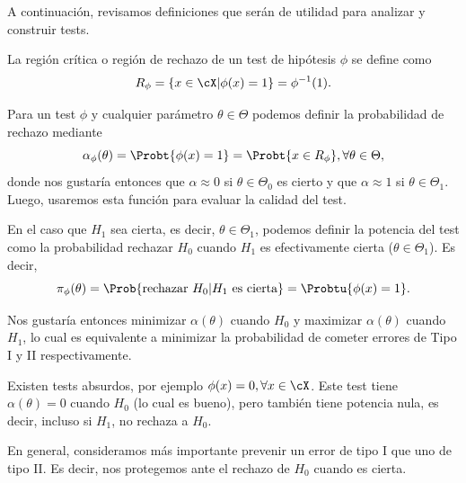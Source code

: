 A continuación, revisamos definiciones que serán de utilidad para analizar y construir tests. 

\begin{definition}
	La región crítica o región de rechazo de un test de hipótesis $\phi$ se define como 
	\begin{equation}
		R_\phi = \{x\in\cX | \phi(x)=1\} = \phi^{-1}(1).
	\end{equation}
	
\end{definition}



\begin{definition}
Para un test $\phi$ y cualquier parámetro $\theta\in\Theta$ podemos definir la probabilidad de rechazo mediante
\begin{equation}
 	\alpha_\phi(\theta) = \Probt{\phi(x)=1} = \Probt{x\in R_\phi}, \forall\theta\in\Theta,
 \end{equation}
donde nos gustaría entonces que $\alpha\approx 0$ si $\theta\in\Theta_0$ es cierto y que $\alpha\approx 1$ si $\theta\in\Theta_1$. Luego, usaremos esta función para evaluar la calidad del test.
\end{definition}

\begin{definition}
En el caso que $H_1$ sea cierta, es decir, $\theta\in\Theta_1$, podemos definir la potencia del test como la probabilidad rechazar $H_0$ cuando $H_1$ es efectivamente cierta ($\theta\in\Theta_1$). Es decir,
\begin{equation}
 	\pi_\phi(\theta) = \Prob{\text{rechazar } H_0 | H_1 \text{ es cierta}}  = \Probtu{\phi(x)=1}.
 \end{equation}
 \end{definition}
Nos gustaría entonces minimizar $\alpha(\theta)$ cuando $H_0$ y maximizar $\alpha(\theta)$ cuando $H_1$, lo cual es equivalente a minimizar la probabilidad de cometer errores de Tipo I y II respectivamente. 


\begin{example}
	Existen tests absurdos, por ejemplo $\phi(x) = 0,\forall x\in\cX$. Este test tiene $\alpha(\theta)=0$ cuando $H_0$ (lo cual es bueno), pero también tiene potencia nula, es decir, incluso si $H_1$, no rechaza a $H_0$. 
 \end{example} 
 En general, consideramos más importante prevenir un error de tipo I que uno de tipo II. Es decir, nos protegemos ante el rechazo de $H_0$ cuando es cierta. 


